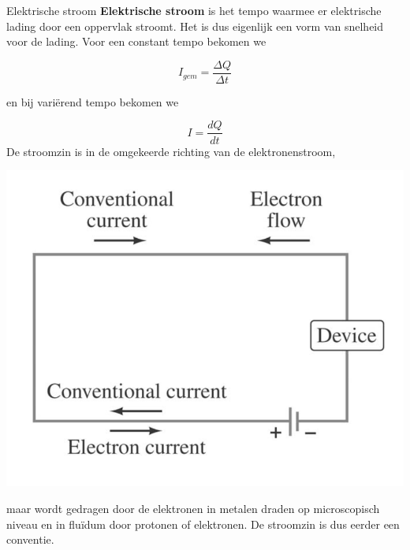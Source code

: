 \begin{theo}{Elektrische stroom}
    \textbf{Elektrische stroom} is het tempo waarmee er elektrische lading door een oppervlak stroomt. Het is dus eigenlijk een vorm van snelheid voor de lading. Voor een constant tempo bekomen we

    \begin{equation*}
        I_{gem} = \dfrac{\Delta Q}{\Delta t}
    \end{equation*} 
    
    \noindent en bij variërend tempo bekomen we

    \begin{equation*}
        I = \dfrac{dQ}{dt}
    \end{equation*} 
    De stroomzin is in de omgekeerde richting van de elektronenstroom,
    \begin{center}
        \includegraphics[scale = 0.4]{Images/Elektriciteit/Stroomzin.png}
    \end{center}
    maar wordt gedragen door de elektronen in metalen draden op microscopisch niveau en in fluïdum door protonen of elektronen. De stroomzin is dus eerder een conventie.
\end{theo}

